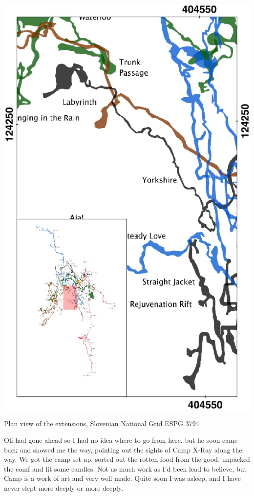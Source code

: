 \begin{marginfigure}
\checkoddpage \ifoddpage \forcerectofloat \else \forceversofloat \fi
\centering
 \includegraphics[width=\linewidth]{images/2015/jack-yorkshire-2015/labyrinth_inset}
 \caption{Plan view of the \protect{} extensions, Slovenian National Grid ESPG 3794}
 \label{Labyrinth inset}
\end{marginfigure}

Oli had gone ahead so I had no idea where to go from here, but he soon came back and showed me the way, pointing out the sights of Camp X-Ray along the way. We got the camp set up, sorted out the rotten food from the good, unpacked the comf and lit some candles. Not as much work as I’d been lead to believe, but Camp  is a work of art and very well made. Quite soon I was asleep, and I have never slept more deeply or more deeply.



